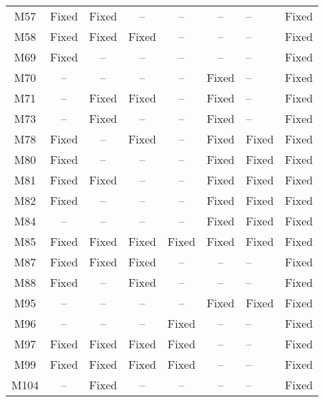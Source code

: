 \begin{table}[!t]
{\begin{tabular}{|c|c|c|c|c|c|}
M57               & Fixed     & Fixed     & --        & --        & --        & --        &Fixed   \\
M58               & Fixed     & Fixed     & Fixed     & --        & --        & --        &Fixed   \\
M69               & Fixed     & --        & --        & --        & --        & --        &Fixed   \\
M70               & --        & --        & --        & --        & Fixed     & --        &Fixed   \\
M71               & --        & Fixed     & Fixed     & --        & Fixed     & --        &Fixed   \\
M73               & --        & Fixed     & --        & --        & Fixed     & --        &Fixed   \\
M78               & Fixed     & --        & Fixed     & --        & Fixed     & Fixed     &Fixed   \\
M80               & Fixed     & --        & --        & --        & Fixed     & Fixed     &Fixed   \\
M81               & Fixed     & Fixed     & --        & --        & Fixed     & Fixed     &Fixed   \\
M82               & Fixed     & --        & --        & --        & Fixed     & Fixed     &Fixed   \\
M84               & --        & --        & --        & --        & Fixed     & Fixed     &Fixed   \\
M85               & Fixed     & Fixed     & Fixed     & Fixed     & Fixed     & Fixed     &Fixed   \\
M87               & Fixed     & Fixed     & Fixed     & --        & --        & --        &Fixed   \\
M88               & Fixed     & --        & Fixed     & --        & --        & --        &Fixed   \\
M95               & --        & --        & --        & --        & Fixed     & Fixed     &Fixed   \\
M96               & --        & --        & --        & Fixed     & --        & --        &Fixed   \\
M97               & Fixed     & Fixed     & Fixed     & Fixed     & --        & --        &Fixed   \\
M99               & Fixed     & Fixed     & Fixed     & Fixed     & --        & --        &Fixed   \\
M104              & --        & Fixed     & --        & --        & --        & --        &Fixed   \\

\end{tabular}}
\end{table}
